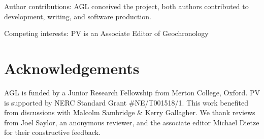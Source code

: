 \documentclass[gchron, manuscript]{article}
\begin{document}
Author contributions: {AGL conceived the project, both authors contributed to development, writing, and software production.} %

Competing interests: {PV is an Associate Editor of Geochronology} %

\section*{Acknowledgements}

AGL is funded by a Junior Research Fellowship from Merton College, Oxford. PV is supported by NERC Standard Grant \#NE/T001518/1. This work benefited from discussions with Malcolm Sambridge \& Kerry Gallagher. We thank reviews from Joel Saylor, an anonymous reviewer, and the associate editor Michael Dietze for their constructive feedback. 













\end{document}
